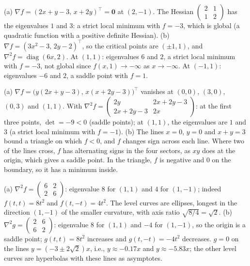 \documentclass[11pt]{article}
\DeclareMathOperator{\diag}{diag}
\begin{document}
\begin{description}[leftmargin=0pt, itemsep=0.3em]
    \item[\ref{pr:classify}.] (a) $\nabla f = (2x + y - 3, \, x + 2y)^\top = \mathbf{0}$ at $(2, -1)$. The Hessian $\begin{pmatrix} 2 & 1 \\ 1 & 2 \end{pmatrix}$ has the eigenvalues $1$ and $3$: a strict local minimum with $f = -3$, which is global (a quadratic function with a positive definite Hessian). (b) $\nabla f = (3x^2 - 3, \, 2y - 2)^\top$, so the critical points are $(\pm 1, 1)$, and $\nabla^2 f = \diag(6x, 2)$. At $(1, 1)$: eigenvalues $6$ and $2$, a strict local minimum with $f = -3$, not global since $f(x, 1) \to -\infty$ as $x \to -\infty$. At $(-1, 1)$: eigenvalues $-6$ and $2$, a saddle point with $f = 1$.
    \item[\ref{pr:four-critical}.] (a) $\nabla f = \big(y(2x + y - 3), \, x(x + 2y - 3)\big)^\top$ vanishes at $(0, 0)$, $(3, 0)$, $(0, 3)$ and $(1, 1)$. With $\nabla^2 f = \begin{pmatrix} 2y & 2x + 2y - 3 \\ 2x + 2y - 3 & 2x \end{pmatrix}$: at the first three points, $\det = -9 < 0$ (saddle points); at $(1, 1)$, the eigenvalues are $1$ and $3$ (a strict local minimum with $f = -1$). (b) The lines $x = 0$, $y = 0$ and $x + y = 3$ bound a triangle on which $f < 0$, and $f$ changes sign across each line. Where two of the lines cross, $f$ has alternating signs in the four sectors, as $xy$ does at the origin, which gives a saddle point. In the triangle, $f$ is negative and $0$ on the boundary, so it has a minimum inside.
    \item[\ref{pr:quadratic-geometry}.] (a) $\nabla^2 f = \begin{pmatrix} 6 & 2 \\ 2 & 6 \end{pmatrix}$: eigenvalue $8$ for $(1, 1)$ and $4$ for $(1, -1)$; indeed $f(t, t) = 8t^2$ and $f(t, -t) = 4t^2$. The level curves are ellipses, longest in the direction $(1, -1)$ of the smaller curvature, with axis ratio $\sqrt{8/4} = \sqrt{2}$. (b) $\nabla^2 g = \begin{pmatrix} 2 & 6 \\ 6 & 2 \end{pmatrix}$: eigenvalue $8$ for $(1, 1)$ and $-4$ for $(1, -1)$, so the origin is a saddle point; $g(t, t) = 8t^2$ increases and $g(t, -t) = -4t^2$ decreases. $g = 0$ on the lines $y = (-3 \pm 2\sqrt{2})x$, i.e., $y \approx -0.17x$ and $y \approx -5.83x$; the other level curves are hyperbolas with these lines as asymptotes.

\end{description}
\end{document}
